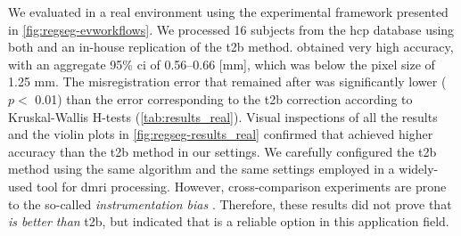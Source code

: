 We evaluated \regseg{} in a real environment using the experimental framework presented
  in \autoref{fig:regseg-evworkflows}.
We processed 16 subjects from the \gls*{hcp} database using both \regseg{}
  and an in-house replication of the \acrfull*{t2b} method.
\Regseg{} obtained very high accuracy, with an aggregate 95\% \gls*{ci} of 0.56--0.66 [mm], which was
  below the pixel size of 1.25 mm.
The misregistration error that remained after \regseg{} was significantly lower ($p <$ 0.01) than the
  error corresponding to the \gls*{t2b} correction according to Kruskal-Wallis H-tests
  (\autoref{tab:results_real}).
Visual inspections of all the results  and the violin plots in
  \autoref{fig:regseg-results_real} confirmed that \regseg{} achieved higher accuracy
  than the \gls*{t2b} method in our settings.
We carefully configured the \gls*{t2b} method using the same algorithm and the
  same settings employed in a widely-used tool for \gls*{dmri} processing.
However, cross-comparison experiments are prone to the so-called \emph{instrumentation bias}
  \citep{tustison_instrumentation_2013}.
Therefore, these results did not prove that \regseg{} \emph{is better than} \gls*{t2b},
  but indicated that \regseg{} is a reliable option in this application field.
%

